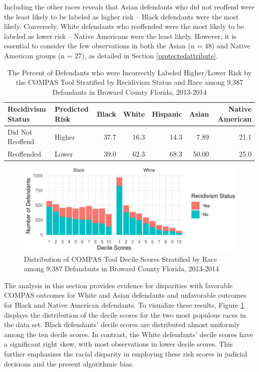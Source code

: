 \documentclass[12pt, twoside]{amherstthesis}
\begin{document}
Including the other races reveals that Asian defendants who did not reoffend were the least likely to be labeled as higher risk -- Black defendants were the most likely. Conversely, White defendants who reoffended were the most likely to be labeled as lower risk -- Native Americans were the least likely. However, it is essential to consider the few observations in both the Asian (n = 48) and Native American groups (n = 27), as detailed in Section \ref{protectedattribute}.
\begin{table}

\caption{\label{tab:ch3table2}The Percent of Defendants who were Incorrectly Labeled Higher/Lower Risk by the COMPAS Tool Stratified by Recidivism Status and Race among 9,387 Defandants in Broward County Florida, 2013-2014}
\centering
\begin{tabular}[t]{llrrrrr}
\toprule
Recidivism Status & Predicted Risk & Black & White & Hispanic & Asian & Native American\\
\midrule
Did Not Reoffend & Higher & 37.7 & 16.3 & 14.3 & 7.89 & 21.1\\
Reoffended & Lower & 39.0 & 62.3 & 68.3 & 50.00 & 25.0\\
\bottomrule
\end{tabular}
\end{table}
\begin{figure}

{\centering \includegraphics{Dasha-Asienga_StatThesis_files/figure-latex/ch3fig11-1} 

}

\caption{Distribution of COMPAS Tool Decile Scores Stratified by Race among 9,387 Defandants in Broward County Florida, 2013-2014}\label{fig:ch3fig11}
\end{figure}
The analysis in this section provides evidence for disparities with favorable COMPAS outcomes for White and Asian defendants and unfavorable outcomes for Black and Native American defendants. To visualize these results, Figure \ref{fig:ch3fig11} displays the distribution of the decile scores for the two most populous races in the data set. Black defendants' decile scores are distributed almost uniformly among the ten decile scores. In contrast, the White defendants' decile scores have a significant right skew, with most observations in lower decile scores. This further emphasizes the racial disparity in employing these risk scores in judicial decisions and the present algorithmic bias.
\end{document}
